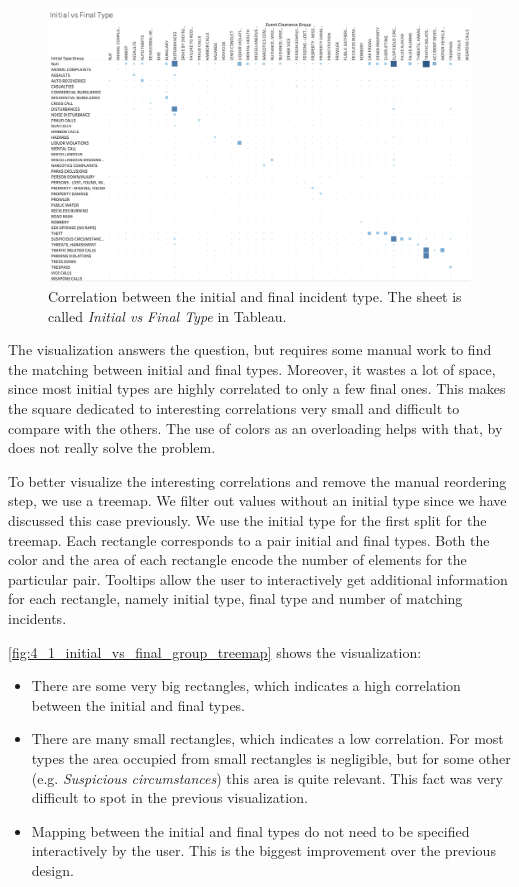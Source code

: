 \begin{figure}[h]
	\centering
	\includegraphics[width=\columnwidth]{figures/4_1_initial_vs_final_group_matrix_plot}
	\caption{Correlation between the initial and final incident type. The sheet is called \textit{Initial vs Final Type} in Tableau.}
	\label{fig:4_1_initial_vs_final_group_matrix_plot}
\end{figure}

The visualization answers the question, but requires some manual work to find the matching between initial and final types.
Moreover, it wastes a lot of space, since most initial types are highly correlated to only a few final ones.
This makes the square dedicated to interesting correlations very small and difficult to compare with the others.
The use of colors as an overloading helps with that, by does not really solve the problem. 

To better visualize the interesting correlations and remove the manual reordering step, we use a treemap.
We filter out values without an initial type since we have discussed this case previously.
We use the initial type for the first split for the treemap.
Each rectangle corresponds to a pair initial and final types.
Both the color and the area of each rectangle encode the number of elements for the particular pair.
Tooltips allow the user to interactively get additional information for each rectangle, namely initial type, final type and number of matching incidents.

\cref{fig:4_1_initial_vs_final_group_treemap} shows the visualization:
\begin{itemize}
	\item There are some very big rectangles, which indicates a high correlation between the initial and final types.
	\item There are many small rectangles, which indicates a low correlation. For most types the area occupied from small rectangles is negligible, but for some other (e.g. \textit{Suspicious circumstances}) this area is quite relevant. This fact was very difficult to spot in the previous visualization.
	\item Mapping between the initial and final types do not need to be specified interactively by the user. This is the biggest improvement over the previous design.
\end{itemize}

